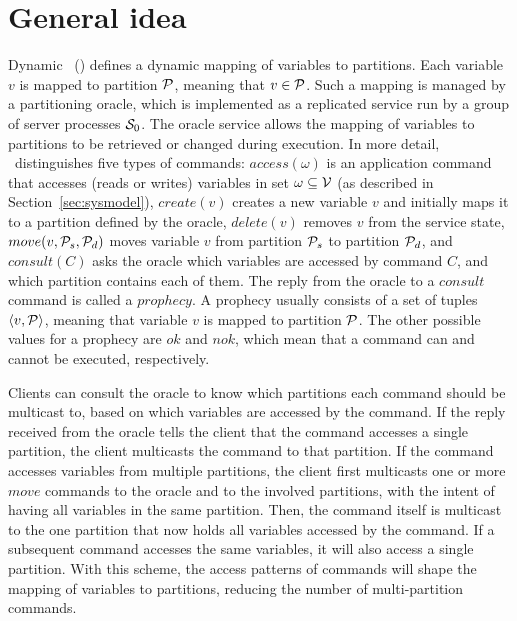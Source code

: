 \section{General idea}
\label{sec:dssmr-idea}

Dynamic \ssmr\ (\dssmr) defines a dynamic mapping of variables to partitions.
Each variable $v$ is mapped to partition $\mathcal{P}$, meaning that $v \in \mathcal{P}$. Such
a mapping is managed by a partitioning oracle, which is implemented as a
replicated service run by a group of server processes $\mathcal{S}_0$. The oracle
service allows the mapping of variables to partitions to be retrieved or changed
during execution. In more detail, \dssmr\ distinguishes five types of commands:
$access(\omega)$ is an application command that accesses (reads or writes)
variables in set $\omega \subseteq \mathcal{V}$ (as described in
Section~\ref{sec:sysmodel}), $create(v)$ creates a new variable $v$ and
initially maps it to a partition defined by the oracle, $delete(v)$ removes $v$
from the service state,
$move(v,\mathcal{P}_s,\mathcal{P}_d)$ moves variable $v$ from partition $\mathcal{P}_s$ to partition
$\mathcal{P}_d$, and $consult(C)$ asks the oracle which variables are accessed by
command $C$, and which partition contains each of them. The reply from the
oracle to a $consult$ command is called a $prophecy$. A prophecy usually
consists of a set of tuples $\langle v, \mathcal{P} \rangle$, meaning that variable $v$
is mapped to partition $\mathcal{P}$. The other possible values for a prophecy are $ok$
and $nok$, which mean that a command can and cannot be executed, respectively.

Clients can consult the oracle to know which partitions each command should be
multicast to, based on which variables are accessed by the command. If the reply
received from the oracle tells the client that the command accesses a single
partition, the client multicasts the command to that partition. If the command
accesses variables from multiple partitions, the client first multicasts one or
more $move$ commands to the oracle and to the involved partitions, with the
intent of having all variables in the same partition. Then, the command itself
is multicast to the one partition that now holds all variables accessed by the
command. If a subsequent command accesses the same variables, it will also
access a single partition. With this scheme, the access patterns of commands
will shape the mapping of variables to partitions, reducing the number of
multi-partition commands.

